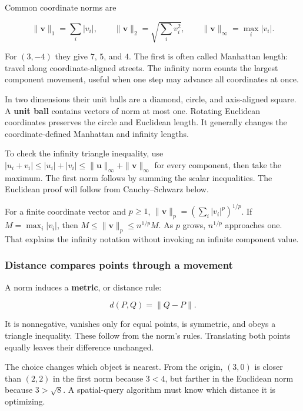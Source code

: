 Common coordinate norms are

\[
\|\mathbf v\|_1=\sum_i|v_i|,\qquad
\|\mathbf v\|_2=\sqrt{\sum_iv_i^2},\qquad
\|\mathbf v\|_\infty=\max_i|v_i|.
\]

For \((3,-4)\) they give \(7\), \(5\), and \(4\). The first is often called Manhattan length: travel along coordinate-aligned streets. The infinity norm counts the largest component movement, useful when one step may advance all coordinates at once.

In two dimensions their unit balls are a diamond, circle, and axis-aligned square. A \textbf{unit ball} contains vectors of norm at most one. Rotating Euclidean coordinates preserves the circle and Euclidean length. It generally changes the coordinate-defined Manhattan and infinity lengths.

To check the infinity triangle inequality, use \(|u_i+v_i|\le|u_i|+|v_i|\le\|\mathbf u\|_\infty+\|\mathbf v\|_\infty\) for every component, then take the maximum. The first norm follows by summing the scalar inequalities. The Euclidean proof will follow from Cauchy--Schwarz below.

For a finite coordinate vector and \(p\ge1\), \(\|\mathbf v\|_p=(\sum_i|v_i|^p)^{1/p}\). If \(M=\max_i|v_i|\), then \(M\le\|\mathbf v\|_p\le n^{1/p}M\). As \(p\) grows, \(n^{1/p}\) approaches one. That explains the infinity notation without invoking an infinite component value.

\subsubsection{Distance compares points through a movement}\label{01-foundations-i-ch017-distance-compares-points-through-a-movement}

\hypertarget{01-foundations-i-ch017-distance-compares-points-through-a-movement}{}

A norm induces a \textbf{metric}, or distance rule:

\[
d(P,Q)=\|Q-P\|.
\]

It is nonnegative, vanishes only for equal points, is symmetric, and obeys a triangle inequality. These follow from the norm's rules. Translating both points equally leaves their difference unchanged.

The choice changes which object is nearest. From the origin, \((3,0)\) is closer than \((2,2)\) in the first norm because \(3<4\), but farther in the Euclidean norm because \(3>\sqrt8\). A spatial-query algorithm must know which distance it is optimizing.

